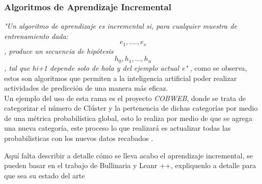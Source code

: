         \subsubsection{Algoritmos de Aprendizaje Incremental}
            \textit{"Un algoritmo de aprendizaje es incremental si,
            para cualquier muestra de entrenamiento dada:
            \begin{equation}
                e_{1} , .... , e_{s}
			\end{equation}
            , produce un secuencia de hipótesis 
            \begin{equation}
                h_{0} , h_{1}, . . . , h_{n} 
            \end{equation}
            , tal que hi+1 depende solo de hola y del ejemplo actual e"} \cite{GiraudCarrier2000}, como se 
            observa, estos son algoritmos que permiten a la inteligencia artificial poder realizar actividades de predicci\'on 
            de una manera m\'as eficaz.\\
            Un ejemplo del uso de esta rama es el proyecto \textit{COBWEB}, donde se trata de categorizar el n\'umero de Cl\'uster y la pertenencia 
            de dichas categor\'ias por medio de una m\'etrica probabil\'istica global, esto lo realiza por medio de que se agrega 
            una nueva categor\'ia, este proceso lo que realizar\'a es actualizar todas las probabilisticas con los nuevos datos recabados \cite{fisher1987}.

Aquí falta describir a detalle cómo se lleva acabo el aprendizaje incremental, se pueden basar en el trabajo de Bullinaria y Leanr ++, expliquenlo a detalle para que sea su estado del arte
